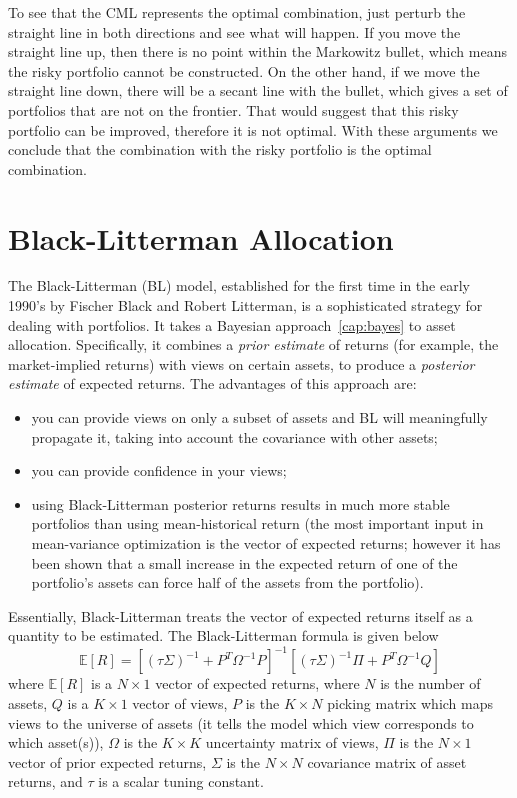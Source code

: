 To see that the CML represents the optimal combination, just perturb the straight line in both directions and see what will happen. If you move the straight line up, then there is no point within the Markowitz bullet, which means the risky portfolio cannot be constructed. On the other hand, if we move the straight line down, there will be a secant line with the bullet, which gives a set of portfolios that are not on the frontier. That would suggest that this risky portfolio can be improved, therefore it is not optimal. With these arguments we conclude that the combination with the risky portfolio is the optimal combination.

\section{Black-Litterman Allocation}
\label{sec:black-litterman}
The Black-Litterman (BL) model, established for the first time in the early 1990’s by Fischer Black and Robert Litterman, is a sophisticated strategy for dealing with portfolios. It takes a Bayesian approach~\ref{cap:bayes} to asset allocation. Specifically, it combines a \emph{prior estimate} of returns (for example, the market-implied returns) with views on certain assets, to produce a \emph{posterior estimate} of expected returns. The advantages of this approach are:
\begin{itemize}
\item you can provide views on only a subset of assets and BL will meaningfully propagate it, taking into account the covariance with other assets;
\item you can provide confidence in your views;
\item using Black-Litterman posterior returns results in much more stable portfolios than using mean-historical return (the most important input in mean-variance optimization is the vector of expected returns; however it has been shown that a small increase in the expected return of one of the portfolio's assets can force half of the assets from the portfolio).
\end{itemize}

Essentially, Black-Litterman treats the vector of expected returns itself as a quantity to be estimated. The Black-Litterman formula is given below
\begin{equation}
  \mathbb{E}[R] = [(\tau\Sigma)^{-1}+P^T\Omega^{-1}P]^{-1}[(\tau\Sigma)^{-1}\Pi + P^T\Omega^{-1}Q]
  \label{eq:bl_formula}
\end{equation}
where $\mathbb{E}[R]$ is a $N\times1$ vector of expected returns, where $N$ is the number of assets, $Q$ is a $K\times1$ vector of views, $P$ is the $K\times N$ picking matrix which maps views to the universe of assets (it tells the model which view corresponds to which asset(s)), $\Omega$ is the $K\times K$ uncertainty matrix of views, $\Pi$ is the $N\times 1$ vector of prior expected returns, $\Sigma$ is the $N\times N$ covariance matrix of asset returns, and $\tau$ is a scalar tuning constant.

